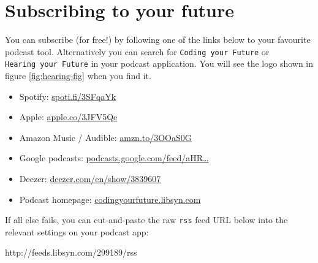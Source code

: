 \documentclass[
]{book}
\newenvironment{Shaded}{\begin{snugshade}}{\end{snugshade}}
\newcommand{\NormalTok}[1]{#1}
\providecommand{\tightlist}{%
  \setlength{\itemsep}{0pt}\setlength{\parskip}{0pt}}
\begin{document}
\hypertarget{subscribing}{%
\section{Subscribing to your future}\label{subscribing}}

You can subscribe (for free!) by following one of the links below to your favourite podcast tool. Alternatively you can search for \texttt{Coding\ your\ Future} or \texttt{Hearing\ your\ Future} in your podcast application. You will see the logo shown in figure \ref{fig:hearing-fig} when you find it.

\begin{itemize}
\tightlist
\item
  Spotify: \href{https://spoti.fi/3SFqaYk}{spoti.fi/3SFqaYk}
\item
  Apple: \href{https://apple.co/3JFV5Qe}{apple.co/3JFV5Qe}
\item
  Amazon Music / Audible: \href{https://amzn.to/3OOaS0G}{amzn.to/3OOaS0G}
\item
  Google podcasts: \href{https://podcasts.google.com/feed/aHR0cHM6Ly9mZWVkcy5saWJzeW4uY29tLzI5OTE4OS9yc3M=}{podcasts.google.com/feed/aHR\ldots{}}
\item
  Deezer: \href{https://www.deezer.com/en/show/3839607}{deezer.com/en/show/3839607}
\item
  Podcast homepage: \href{https://codingyourfuture.libsyn.com/}{codingyourfuture.libsyn.com}
\end{itemize}

If all else fails, you can cut-and-paste the raw \texttt{rss} feed URL below into the relevant settings on your podcast app:

\begin{Shaded}
\begin{Highlighting}[]
\NormalTok{http://feeds.libsyn.com/299189/rss}
\end{Highlighting}
\end{Shaded}
\end{document}
